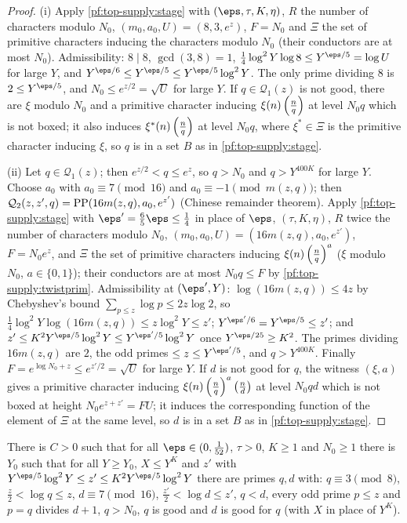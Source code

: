\begin{proof}
(i) Apply \cref{pf:top-supply:stage} with $(\eps,\tau,K,\eta)$, $R$ the number of characters modulo $N_0$,
$(m_0,a_0,U)=(8,3,e^z)$, $F=N_0$ and $\Xi$ the set of primitive characters inducing the characters modulo $N_0$ (their
conductors are at most $N_0$). Admissibility: $8\mid8$, $\gcd(3,8)=1$, $\frac14\log^2Y\log8\le Y^{\eps/5}=\log U$ for
large $Y$, and $Y^{\eps/6}\le Y^{\eps/5}\le Y^{\eps/5}\log^2Y$. The only prime dividing $8$ is $2\le Y^{\eps/5}$, and
$N_0\le e^{z/2}=\sqrt U$ for large $Y$. If $q\in\mathcal Q_1(z)$ is not good, there are $\xi$ modulo $N_0$ and a primitive
character inducing $\xi(n)\left(\frac{n}{q}\right)$ at level $N_0q$ which is not boxed; it also induces
$\xi^*(n)\left(\frac{n}{q}\right)$ at level $N_0q$, where $\xi^*\in\Xi$ is the primitive character inducing $\xi$, so $q$ is in a set
$B$ as in \cref{pf:top-supply:stage}.

(ii) Let $q\in\mathcal Q_1(z)$; then $e^{z/2}<q\le e^z$, so $q>N_0$ and $q>Y^{400K}$ for large $Y$. Choose $a_0$ with
$a_0\equiv7\pmod{16}$ and $a_0\equiv-1\pmod{m(z,q)}$; then $\mathcal Q_2(z,z',q)=\operatorname{PP}(16m(z,q),a_0,e^{z'})$
(Chinese remainder theorem). Apply \cref{pf:top-supply:stage} with $\eps'=\frac65\eps\le\frac14$
in place of $\eps$, $(\tau,K,\eta)$, $R$ twice the number of characters modulo $N_0$, $(m_0,a_0,U)=(16m(z,q),a_0,e^{z'})$,
$F=N_0e^z$, and $\Xi$ the set of primitive characters inducing $\xi(n)\left(\frac{n}{q}\right)^a$ ($\xi$ modulo $N_0$, $a\in\{0,1\}$);
their conductors are at most $N_0q\le F$ by \cref{pf:top-supply:twistprim}. Admissibility at $(\eps',Y)$:
$\log(16m(z,q))\le4z$ by Chebyshev's bound $\sum_{p\le z}\log p\le2z\log2$, so
$\frac14\log^2Y\log(16m(z,q))\le z\log^2Y\le z'$; $Y^{\eps'/6}=Y^{\eps/5}\le z'$; and
$z'\le K^2Y^{\eps/5}\log^2Y\le Y^{\eps'/5}\log^2Y$ once $Y^{\eps/25}\ge K^2$. The primes dividing $16m(z,q)$ are $2$, the
odd primes $\le z\le Y^{\eps'/5}$, and $q>Y^{400K}$. Finally $F=e^{\log N_0+z}\le e^{z'/2}=\sqrt U$ for large $Y$. If $d$ is
not good for $q$, the witness $(\xi,a)$ gives a primitive character inducing $\xi(n)\left(\frac{n}{q}\right)^a\left(\frac{n}{d}\right)$ at level
$N_0qd$ which is not boxed at height $N_0e^{z+z'}=FU$; it induces the corresponding function of the element of $\Xi$ at
the same level, so $d$ is in a set $B$ as in \cref{pf:top-supply:stage}.
\end{proof}

\begin{proposition}\label{pf:top-supply:pairexists}
There is $C>0$ such that for all $\eps\in(0,\frac1{52})$, $\tau>0$, $K\ge1$ and $N_0\ge1$ there is $Y_0$ such that for
all $Y\ge Y_0$, $X\le Y^K$ and $z'$ with $Y^{\eps/5}\log^2Y\le z'\le K^2Y^{\eps/5}\log^2Y$ there are primes $q,d$ with:
$q\equiv3\pmod8$, $\frac z2<\log q\le z$, $d\equiv7\pmod{16}$, $\frac{z'}2<\log d\le z'$, $q<d$, every odd prime $p\le z$
and $p=q$ divides $d+1$, $q>N_0$, $q$ is good and $d$ is good for $q$ (with $X$ in place of $Y^K$).
  
\end{proposition}

